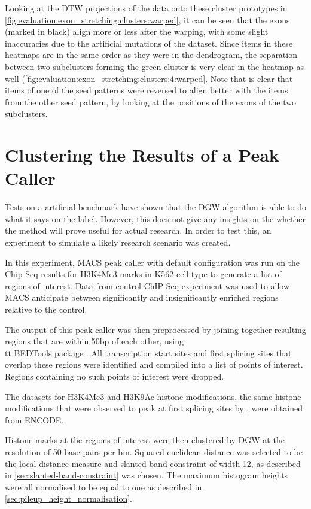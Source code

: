 \documentclass[parskip]{cs4rep}
\newcommand{\histonemodification}[1]{#1}
\newcommand{\celltype}[1]{#1}
\begin{document}
Looking at the DTW projections of the data onto these cluster prototypes in \autoref{fig:evaluation:exon_stretching:clusters:warped}, it can be seen that the exons (marked in black) align more or less after the warping, with some slight inaccuracies due to the artificial mutations of the dataset. Since items in these heatmaps are in the same order as they were in the dendrogram, the separation between two subclusters forming the green cluster is very clear in the heatmap as well (\autoref{fig:evaluation:exon_stretching:clusters:4:warped}. Note that is clear that items of one of the seed patterns were reversed to align better with the items from the other seed pattern, by looking at the positions of the exons of the two subclusters.

\section{Clustering the Results of a Peak Caller}
\label{sec:macs-experiment}
Tests on a artificial benchmark have shown that the DGW algorithm is able to do what it says on the label. However, this does not give any insights on the whether the method will prove useful for actual research. In order to test this, an experiment to simulate a likely research scenario was created.

In this experiment, MACS peak caller with default configuration \cite{Zhang:2008wp} was run on the Chip-Seq results for \histonemodification{H3K4Me3} marks in \celltype{K562} cell type to generate a list of regions of interest. Data from control ChIP-Seq experiment was used to allow MACS anticipate between significantly and insignificantly enriched regions relative to the control.

The output of this peak caller was then preprocessed by joining together resulting regions that are within 50bp of each other, using {\\tt BEDTools} package \cite{Quinlan:2010ur}. 
All transcription start sites and first splicing sites that overlap these regions were identified and compiled into a list of points of interest. Regions containing no such points of interest were dropped.

The datasets for \histonemodification{H3K4Me3} and \histonemodification{H3K9Ac} histone modifications, the same histone modifications that were observed to peak at first splicing sites by \cite{Bieberstein:2012tf}, were obtained from ENCODE.

Histone marks at the regions of interest were then clustered by DGW at the resolution of 50 base pairs per bin. Squared euclidean distance was selected to be the local distance measure and slanted band constraint of width 12, as described in \autoref{sec:slanted-band-constraint} was chosen. The maximum histogram heights were all normalised to be equal to one as described in \autoref{sec:pileup_height_normalisation}.
\end{document}
